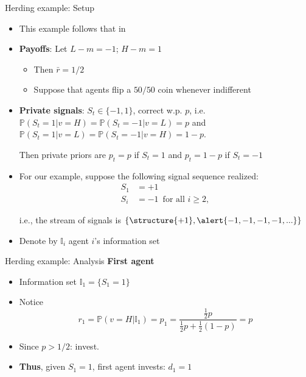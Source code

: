 \documentclass[english,10pt
,aspectratio=169
]{beamer}
\begin{document}
\begin{frame}{Herding example: Setup} \label{EXP}
	\begin{itemize}
		\item This example follows that in \cite{bikhchandani_herd_2000}
		\item \textbf{Payoffs}: Let $L-m = -1$; $H-m = 1$
		\begin{itemize}
			\item Then $\bar{r} = 1/2$
			\item Suppose that agents flip a $50/50$ coin whenever indifferent
		\end{itemize}
		\item \textbf{Private signals}: $S_t \in \{-1,1\}$, correct w.p. $p$, i.e. $\mathbb{P}(S_t=1|v=H) = \mathbb{P}(S_t=-1|v=L) = p$ and $\mathbb{P}(S_t=1|v=L) = \mathbb{P}(S_t=-1|v=H) = 1-p$.
		
		Then private priors are $p_t = p$ if $S_t = 1$ and $p_t = 1-p$ if $S_t = -1$
		\item For our example, suppose the following signal sequence realized:
		\vspace{-1em}
		\begin{align*}
			S_1	& = +1 \\
			S_i	& = -1 \, \text{ for all } i \geq 2,
		\end{align*}
		\vspace{-2.5em}
		
		i.e., the stream of signals is $\{\structure{+1},\alert{ -1, -1, -1, -1, ...}\}$
		\item Denote by $\mathbb{I}_i$ agent $i$'s information set
	\end{itemize}
\end{frame}


\begin{frame}{Herding example: Analysis}
	\textbf{First agent}
	\begin{itemize}
		\item Information set $\mathbb{I}_1=\{S_1=1\}$
		\item Notice
		\[
			r_1 = \mathbb{P}(v=H|\mathbb{I}_1) = p_1 = \frac{\frac{1}{2} p}{\frac{1}{2} p+\frac{1}{2} (1-p)} = p 
		\]
		\item Since $p>1/2$: invest.
		\item \textbf{Thus}, given $S_1=1$, first agent invests: $d_1=1$
	\end{itemize}
\end{frame}
\end{document}
